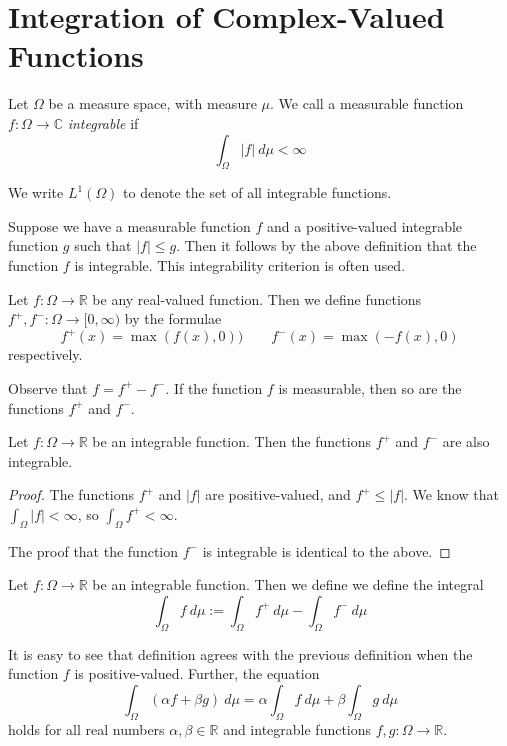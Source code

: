 \section{Integration of Complex-Valued Functions}

\begin{definition}
Let $\Omega$ be a measure space, with measure $\mu$.  We call a measurable function $f\colon \Omega \rightarrow {\mathbb C}$ {\em integrable} if
$$\int_\Omega |f|\ d\mu < \infty$$

We write $L^1 (\Omega )$ to denote the set of all integrable functions.
\end{definition}

Suppose we have a measurable function $f$ and a positive-valued integrable function $g$ such that $|f|\leq g$.  Then it follows by the above definition that the function $f$ is integrable.  This integrability criterion is often used.

\begin{definition}
Let $f\colon \Omega \rightarrow {\mathbb R}$ be any real-valued function.  Then we define functions $f^+ , f^- \colon \Omega \rightarrow [0, \infty )$ by the formulae
$$f^+ (x) = \max (f(x), 0)) \qquad f^- (x) = \max (-f(x) , 0)$$
respectively.
\end{definition}

Observe that $f = f^+ - f^-$.  If the function $f$ is measurable, then so are the functions $f^+$ and $f^-$.

\begin{proposition}
Let $f\colon \Omega \rightarrow {\mathbb R}$ be an integrable function.  Then the functions $f^+$ and $f^-$ are also integrable.
\end{proposition}

\begin{proof}
The functions $f^+$ and $|f|$ are positive-valued, and $f^+ \leq |f|$.  We know that $\int_\Omega |f| < \infty$, so $\int_\Omega f^+ <\infty$.

The proof that the function $f^-$ is integrable is identical to the above.
\end{proof}

\begin{definition}
Let $f\colon \Omega \rightarrow {\mathbb R}$ be an integrable function.  Then we define we define the integral
$$\int_\Omega f\ d\mu := \int_\Omega f^+\ d\mu - \int_\Omega f^-\ d\mu$$
\end{definition}

It is easy to see that definition agrees with the previous definition when the function $f$ is positive-valued.  Further, the equation
$$\int_\Omega (\alpha f + \beta g)\ d\mu = \alpha \int_\Omega f \ d\mu + \beta \int_\Omega g\ d\mu$$
holds for all real numbers $\alpha , \beta \in {\mathbb R}$ and integrable functions $f,g\colon \Omega \rightarrow {\mathbb R}$.

